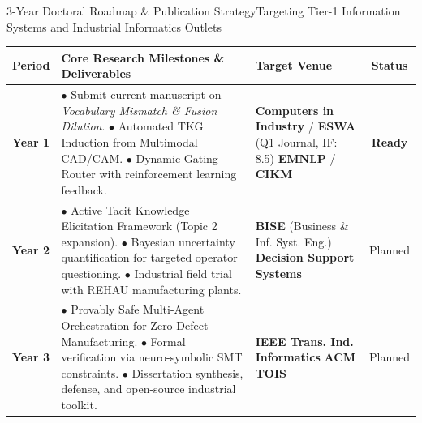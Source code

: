 \documentclass[aspectratio=169,10pt]{beamer}
\begin{document}
\begin{frame}{3-Year Doctoral Roadmap \& Publication Strategy}{Targeting Tier-1 Information Systems and Industrial Informatics Outlets}
  \centering\scriptsize
  \renewcommand{\arraystretch}{0.80}
  \begin{tabular}{p{1.2cm}p{7.2cm}p{3.8cm}c}
    \toprule
    \textbf{Period} & \textbf{Core Research Milestones \& Deliverables} & \textbf{Target Venue} & \textbf{Status} \\
    \midrule
    \textbf{Year 1} & 
    $\bullet$ Submit current manuscript on \textit{Vocabulary Mismatch \& Fusion Dilution}.\newline
    $\bullet$ Automated TKG Induction from Multimodal CAD/CAM.\newline
    $\bullet$ Dynamic Gating Router with reinforcement learning feedback. &
    \textbf{Computers in Industry} / \textbf{ESWA} \newline (Q1 Journal, IF: 8.5) \newline
    \textbf{EMNLP} / \textbf{CIKM} &
    \color{SuccessGreen}\textbf{Ready}\color{NeutralDark} \\[0.4ex]
    \midrule
    \textbf{Year 2} & 
    $\bullet$ Active Tacit Knowledge Elicitation Framework (Topic 2 expansion).\newline
    $\bullet$ Bayesian uncertainty quantification for targeted operator questioning.\newline
    $\bullet$ Industrial field trial with REHAU manufacturing plants. &
    \textbf{BISE} (Business \& Inf. Syst. Eng.) \newline
    \textbf{Decision Support Systems} &
    Planned \\[0.4ex]
    \midrule
    \textbf{Year 3} & 
    $\bullet$ Provably Safe Multi-Agent Orchestration for Zero-Defect Manufacturing.\newline
    $\bullet$ Formal verification via neuro-symbolic SMT constraints.\newline
    $\bullet$ Dissertation synthesis, defense, and open-source industrial toolkit. &
    \textbf{IEEE Trans. Ind. Informatics} \newline
    \textbf{ACM TOIS} &
    Planned \\
    \bottomrule
  \end{tabular}


\end{frame}
\end{document}
